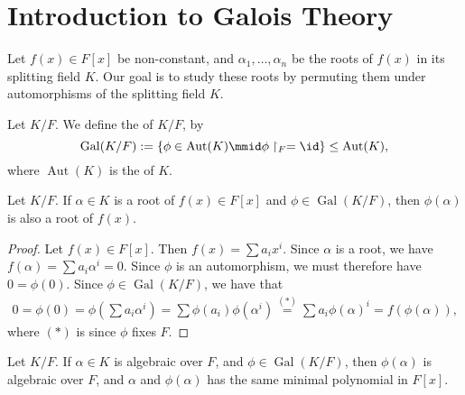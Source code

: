 \documentclass[notoc,notitlepage,nobib]{tufte-book}
\DeclareMathOperator{\Aut}{Aut}
\DeclareMathOperator{\Gal}{Gal}
\begin{document}

\section{Introduction to Galois Theory}%
\label{sec:introduction_to_galois_theory}

Let $f(x) \in F[x]$ be non-constant, and $\alpha_1, \ldots, \alpha_n$ be the
roots of $f(x)$ in its splitting field $K$. Our goal is to study these roots by
permuting them under automorphisms of the splitting field $K$.

\begin{defn}\label{defn:galois_group}
  Let $K / F$. We define the  of $K / F$, by
  \begin{equation*}
    \Gal(K / F) := \left\{ \phi \in \Aut(K) \mmid \phi \restriction_{F} = \id
    \right\} \leq \Aut(K),
  \end{equation*}
  where $\Aut(K)$ is the  of $K$.
\end{defn}

\begin{lemma}\label{lemma:the_galois_group_permutes_algebraic_roots}
  Let $K / F$. If $\alpha \in K$ is a root of $f(x) \in F[x]$ and $\phi \in
  \Gal(K / F)$, then $\phi(\alpha)$ is also a root of $f(x)$. 
\end{lemma}

\begin{proof}
  Let $f(x) \in F[x]$. Then $f(x) = \sum a_i x^i$. Since $\alpha$ is a root, we
  have $f(\alpha) = \sum a_i \alpha^i = 0$. Since $\phi$ is an automorphism, we
  must therefore have $0 = \phi(0)$. Since $\phi \in \Gal(K / F)$, we have that
  \begin{align*}
    0 = \phi(0) = \phi ( \sum a_i \alpha^i ) = \sum \phi(a_i) \phi(\alpha^i)
    \overset{(*)}{=} \sum a_i \phi(\alpha)^i = f(\phi(\alpha)),
  \end{align*}
  where $(*)$ is since $\phi$ fixes $F$.
\end{proof}

\begin{crly}\label{crly:elements_of_the_galois_group_permutes_roots_of_the_same_minimal_polynomial}
  Let $K / F$. If $\alpha \in K$ is algebraic over $F$, and $\phi \in \Gal(K /
  F)$, then $\phi(\alpha)$ is algebraic over $F$, and $\alpha$ and
  $\phi(\alpha)$ has the same minimal polynomial in $F[x]$.
\end{crly}
\end{document}
